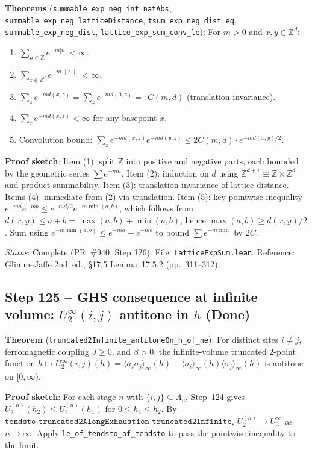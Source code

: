 \documentclass[a4paper,11pt]{article}
\begin{document}
\noindent\textbf{Theorems} (\texttt{summable\_exp\_neg\_int\_natAbs},
\texttt{summable\_exp\_neg\_latticeDistance},
\texttt{tsum\_exp\_neg\_dist\_eq},
\texttt{summable\_exp\_neg\_dist},
\texttt{lattice\_exp\_sum\_conv\_le}):
For $m > 0$ and $x, y \in \mathbb{Z}^d$:
\begin{enumerate}
\item $\sum_{n \in \mathbb{Z}} e^{-m|n|} < \infty$.
\item $\sum_{z \in \mathbb{Z}^d} e^{-m \|z\|_1} < \infty$.
\item $\sum_z e^{-m d(x,z)} = \sum_z e^{-m d(0,z)} =: C(m,d)$ (translation invariance).
\item $\sum_z e^{-m d(x,z)} < \infty$ for any basepoint $x$.
\item Convolution bound: $\sum_z e^{-m d(x,z)} e^{-m d(y,z)} \leq 2 C(m,d) \cdot e^{-m d(x,y)/2}$.
\end{enumerate}

\noindent\textbf{Proof sketch}:
Item (1): split $\mathbb{Z}$ into positive and negative parts, each bounded by the geometric series $\sum e^{-mn}$.
Item (2): induction on $d$ using $\mathbb{Z}^{d+1} \cong \mathbb{Z} \times \mathbb{Z}^d$ and product summability.
Item (3): translation invariance of lattice distance.
Items (4): immediate from (2) via translation.
Item (5): key pointwise inequality $e^{-m a} e^{-m b} \leq e^{-m d/2} e^{-m \min(a,b)}$,
which follows from $d(x,y) \leq a + b = \max(a,b) + \min(a,b)$, hence $\max(a,b) \geq d(x,y)/2$.
Sum using $e^{-m \min(a,b)} \leq e^{-m a} + e^{-m b}$ to bound $\sum e^{-m \min}$ by $2C$.

\noindent\textit{Status}: Complete (PR~\#940, Step 126).
File: \texttt{LatticeExpSum.lean}.
Reference: Glimm--Jaffe 2nd~ed., \S17.5 Lemma~17.5.2 (pp.~311--312).

\subsection*{Step 125 -- GHS consequence at infinite volume: $U_2^\infty(i,j)$ antitone in $h$ (Done)}

\noindent\textbf{Theorem} (\texttt{truncated2Infinite\_antitoneOn\_h\_of\_ne}):
For distinct sites $i \neq j$, ferromagnetic coupling $J \geq 0$, and $\beta > 0$,
the infinite-volume truncated 2-point function
$h \mapsto U_2^\infty(i,j)(h) = \langle\sigma_i\sigma_j\rangle_\infty(h) - \langle\sigma_i\rangle_\infty(h)\langle\sigma_j\rangle_\infty(h)$
is antitone on $[0,\infty)$.

\noindent\textbf{Proof sketch}:
For each stage $n$ with $\{i,j\} \subseteq \Lambda_n$, Step~124 gives
$U_2^{(n)}(h_2) \leq U_2^{(n)}(h_1)$ for $0 \leq h_1 \leq h_2$.
By $\texttt{tendsto\_truncated2AlongExhaustion\_truncated2Infinite}$,
$U_2^{(n)} \to U_2^\infty$ as $n \to \infty$.
Apply \texttt{le\_of\_tendsto\_of\_tendsto} to pass the pointwise inequality to the limit.
\end{document}
